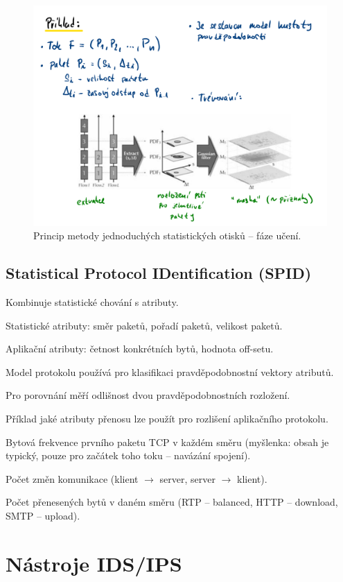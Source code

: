 \begin{figure}[H]
    \centering
    \includegraphics[width=1\linewidth]{metoda_jednoduchych_statistickych_otisku_priklad.pdf}
    \caption{Princip metody jednoduchých statistických otisků -- fáze učení.}
\end{figure}

\subsection*{Statistical Protocol IDentification (SPID)}

\begin{compactitem}
    \item Kombinuje statistické chování s atributy.
    \item Statistické atributy: směr paketů, pořadí paketů, velikost paketů.
    \item Aplikační atributy: četnost konkrétních bytů, hodnota off-setu.
    \item Model protokolu používá pro klasifikaci pravděpodobnostní vektory atributů.
    \item Pro porovnání měří odlišnost dvou pravděpodobnostních rozložení.
    \item Příklad jaké atributy přenosu lze použít pro rozlišení aplikačního protokolu. \begin{compactitem}
        \item Bytová frekvence prvního paketu TCP v každém směru (myšlenka: obsah je typický, pouze pro začátek toho toku -- navázání spojení).
        \item Počet změn komunikace (klient $\rightarrow$ server, server $\rightarrow$ klient).
        \item Počet přenesených bytů v daném směru (RTP -- balanced, HTTP -- download, SMTP -- upload).
    \end{compactitem}
\end{compactitem}


\section{Nástroje IDS/IPS}

